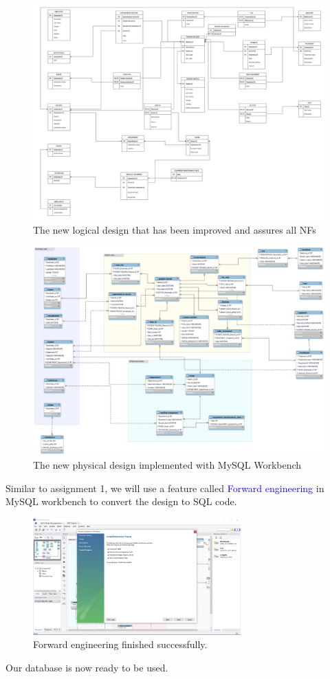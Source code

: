 \documentclass[a4paper]{article}
\numberwithin{equation}{section}
\begin{document}
\begin{figure}[H]
  \centering
  \includegraphics[width = 12cm ]{assets/newLogicalDesign.png}
  \captionsetup{justification=centering,margin=2cm}
  \caption{The new logical design that has been improved and assures all NFs}
\end{figure}

\newpage
\begin{figure}[H]
    \centering
    \includegraphics[width = 12cm]{assets/New_logcial_design.png}
    \captionsetup{justification=centering,margin=2cm}
    \caption{The new physical design implemented with MySQL Workbench}
\end{figure}

Similar to assignment 1, we will use a feature called \textcolor{blue}{Forward engineering } in MySQL workbench to convert the design to SQL code.  

\begin{figure}[H]
    \centering
    \includegraphics[width = 8cm]{assets/step2.png}
    \captionsetup{justification=centering,margin=2cm}
    \caption{Forward engineering finished successfully.}
\end{figure}
Our database is now ready to be used.
\end{document}

